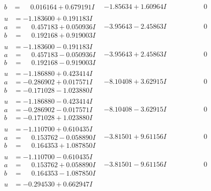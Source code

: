 \documentclass[1p]{elsarticle_modified}
\theoremstyle{definition}
\begin{document}
$$\begin{array}{c|c|c}
\begin{aligned}
b &= \phantom{-}0.016164 + 0.679191 I\end{aligned}
 & -1.85634 + 1.60964 I & \phantom{-0.000000 } 0 \\ \hline\begin{aligned}
u &= -1.183600 + 0.191183 I \\
a &= \phantom{-}0.457183 + 0.050936 I \\
b &= \phantom{-}0.192168 + 0.919003 I\end{aligned}
 & -3.95643 - 2.45863 I & \phantom{-0.000000 } 0 \\ \hline\begin{aligned}
u &= -1.183600 - 0.191183 I \\
a &= \phantom{-}0.457183 - 0.050936 I \\
b &= \phantom{-}0.192168 - 0.919003 I\end{aligned}
 & -3.95643 + 2.45863 I & \phantom{-0.000000 } 0 \\ \hline\begin{aligned}
u &= -1.186880 + 0.423414 I \\
a &= -0.286902 + 0.017571 I \\
b &= -0.171028 - 1.023880 I\end{aligned}
 & -8.10408 + 3.62915 I & \phantom{-0.000000 } 0 \\ \hline\begin{aligned}
u &= -1.186880 - 0.423414 I \\
a &= -0.286902 - 0.017571 I \\
b &= -0.171028 + 1.023880 I\end{aligned}
 & -8.10408 - 3.62915 I & \phantom{-0.000000 } 0 \\ \hline\begin{aligned}
u &= -1.110700 + 0.610435 I \\
a &= \phantom{-}0.153762 - 0.058890 I \\
b &= \phantom{-}0.164353 + 1.087850 I\end{aligned}
 & -3.81501 + 9.61156 I & \phantom{-0.000000 } 0 \\ \hline\begin{aligned}
u &= -1.110700 - 0.610435 I \\
a &= \phantom{-}0.153762 + 0.058890 I \\
b &= \phantom{-}0.164353 - 1.087850 I\end{aligned}
 & -3.81501 - 9.61156 I & \phantom{-0.000000 } 0 \\ \hline\begin{aligned}
u &= -0.294530 + 0.662947 I \\

\end{aligned}
\end{array}$$
\end{document}
